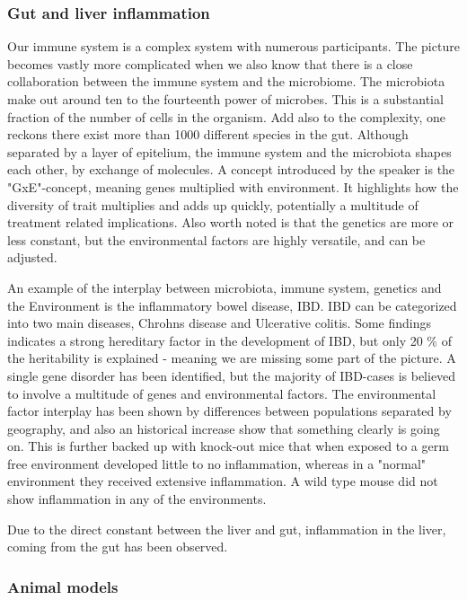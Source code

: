 \documentclass[12p]{article}
\begin{document}
\subsubsection*{Gut and liver inflammation}

Our immune system is a complex system with numerous participants.
The picture becomes vastly more complicated when we also know that there is a close collaboration between the immune system and the microbiome.
The microbiota make out around ten to the fourteenth power of microbes.
This is a substantial fraction of the number of cells in the organism.
Add also to the complexity, one reckons there exist more than 1000 different species in the gut.
Although separated by a layer of epitelium, the immune system and the microbiota shapes each other, by exchange of molecules.
A concept introduced by the speaker is the "GxE"-concept, meaning genes multiplied with environment.
It highlights how the diversity of trait multiplies and adds up quickly, potentially a multitude of treatment related implications.
Also worth noted is that the genetics are more or less constant, but the environmental factors are highly versatile, and can be adjusted.

An example of the interplay between microbiota, immune system, genetics and the Environment is the inflammatory bowel disease, IBD.
IBD can be categorized into two main diseases, Chrohns disease and Ulcerative colitis.
Some findings indicates a strong hereditary factor in the development of IBD, but only 20 \% of the heritability is explained - meaning we are missing some part of the picture.
A single gene disorder has been identified, but the majority of IBD-cases is believed to involve a multitude of genes and environmental factors.
The environmental factor interplay has been shown by differences between populations separated by geography, and also an historical increase show that something clearly is going on.
This is further backed up with knock-out mice that when exposed to a germ free environment developed little to no inflammation, whereas in a "normal" environment they received extensive inflammation.
A wild type mouse did not show inflammation in any of the environments.

Due to the direct constant between the liver and gut, inflammation in the liver, coming from the gut has been observed.

\subsubsection*{Animal models}
\end{document}
